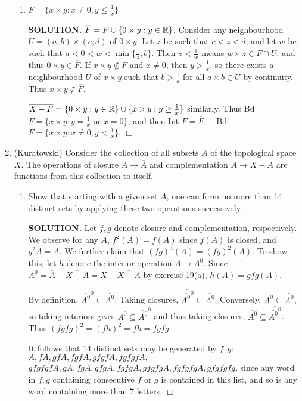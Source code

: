 \documentclass{article}
\begin{document}
\begin{enumerate}
\begin{enumerate}
            \item $F = \{x \times y: x \neq 0, y \leq \frac1x\}$

            {\bf SOLUTION.} $\overline{F} = F \cup \{0 \times y: y \in \mathbb{R}\}$. Consider any neighbourhood $U = (a, b) \times (c, d)$ of $0 \times y$. Let $z$ be such that $c < z< d$, and let $w$ be such that $a < 0 < w < \min\{\frac1z, b\}$. Then $z < \frac1w$ means $w \times z \in F \cap U$, and thus $0 \times y \in \overline{F}$. If $x \times y \notin F$ and $x \neq 0$, then $y > \frac1x$, so there exists a neighbourhood $U$ of $x \times y$ such that $b > \frac1a$ for all $a \times b \in U$ by continuity. Thus $x \times y \notin \overline{F}$.

            $\overline{X-F} = \{0 \times y: y \in \mathbb{R}\} \cup \{x \times y: y \geq \frac1x\}$ similarly. Thus Bd $F = \{x \times y: y = \frac1x \text{ or } x = 0 \}$, and then Int $F = \overline{F} - $ Bd $F = \{x \times y: x \neq 0, y < \frac1x \}$. $\Box$
        \end{enumerate}

    \item (Kuratowski) Consider the collection of all subsets $A$ of the topological space $X$. The operations of closure $A \rightarrow \overline{A}$ and complementation $A \rightarrow X - A$ are functions from this collection to itself.
        \begin{enumerate}
            \item Show that starting with a given set $A$, one can form no more than 14 distinct sets by applying these two operations successively.

            {\bf SOLUTION.} Let $f, g$ denote closure and complementation, respectively. We observe for any $A$, $f^2(A) = f(A)$ since $f(A)$ is closed, and $g^2 A = A$. We further claim that $(fg)^4 (A) = (fg)^2 (A)$. To show this, let $h$ denote the interior operation $A \rightarrow A^0$. Since $A^0 = \overline{A} - \overline{X-A} = X - \overline{X-A}$ by exercise 19(a), $h(A) = gfg(A)$.

            By definition, $\overline{A^0}^0 \subseteq \overline{A^0}$. Taking closures, $\overline{\overline{A^0}^0} \subseteq \overline{A^0}$. Conversely, $A^0 \subseteq \overline{A^0}$, so taking interiors gives $A^0 \subseteq \overline{A^0}^0$ and thus taking closures, $\overline{A^0} \subseteq \overline{\overline{A^0}^0}$. Thus $(fgfg)^2 = (fh)^2 = fh = fgfg$.
            
            It follows that 14 distinct sets may be generated by $f, g$: $A, fA, gfA, fgfA, gfgfA, fgfgfA,$ $ gfgfgfA, gA, fgA, gfgA, fgfgA, gfgfgA, fgfgfgA, gfgfgfg$, since any word in $f, g$ containing consecutive $f$ or $g$ is contained in this list, and so is any word containing more than 7 letters. $\Box$
            

\end{enumerate}
\end{enumerate}
\end{document}
